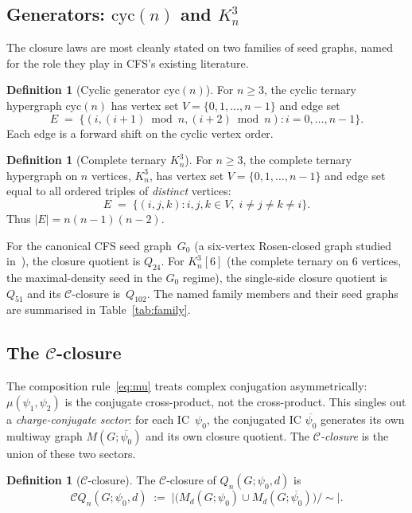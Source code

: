 \documentclass[12pt,a4paper]{article}
\theoremstyle{definition}
\newtheorem{definition}[theorem]{Definition}
\theoremstyle{remark}
\newcommand{\Kn}{K_n^3}
\newcommand{\Qn}{Q_n}
\newcommand{\Ccls}{\mathcal{C}}             %
\newcommand{\cyc}{\mathrm{cyc}}
\begin{document}
\subsection{Generators: $\cyc(n)$ and $\Kn$}
\label{sec:bg-generators}

The closure laws are most cleanly stated on two families of seed
graphs, named for the role they play in CFS's existing literature.

\begin{definition}[Cyclic generator $\cyc(n)$]\label{def:cyc}
For $n \ge 3$, the cyclic ternary hypergraph $\cyc(n)$ has vertex set
$V = \{0, 1, \dots, n{-}1\}$ and edge set
\[
E \;=\; \{(i, (i{+}1) \bmod n, (i{+}2) \bmod n) : i = 0, \dots, n{-}1\}.
\]
Each edge is a forward shift on the cyclic vertex order.
\end{definition}

\begin{definition}[Complete ternary $\Kn$]\label{def:Kn}
For $n \ge 3$, the complete ternary hypergraph on $n$ vertices, $\Kn$,
has vertex set $V = \{0, 1, \dots, n{-}1\}$ and edge set equal to all
ordered triples of \emph{distinct} vertices:
\[
E \;=\; \{(i, j, k) : i, j, k \in V, \; i \ne j \ne k \ne i\}.
\]
Thus $|E| = n(n{-}1)(n{-}2)$.
\end{definition}

For the canonical CFS seed graph~$G_0$ (a six-vertex Rosen-closed
graph studied in~\cite[\S{}Step 3]{CFS2026}), the closure quotient is
$Q_{24}$. For $\Kn[6]$ (the complete ternary on 6 vertices, the
maximal-density seed in the $G_0$ regime), the single-side closure
quotient is~$Q_{51}$ and its $\Ccls$-closure is~$Q_{102}$. The named
family members and their seed graphs are summarised in
Table~\ref{tab:family}.

\subsection{The $\Ccls$-closure}\label{sec:bg-Cclosure}

The composition rule~\eqref{eq:mu} treats complex conjugation
asymmetrically: $\mu(\psi_1, \psi_2)$ is the conjugate cross-product,
not the cross-product. This singles out a \emph{charge-conjugate
sector}: for each IC~$\psi_0$, the conjugated IC
$\overline{\psi_0}$ generates its own multiway graph
$M(G; \overline{\psi_0})$ and its own closure quotient. The
\emph{$\Ccls$-closure} is the union of these two sectors.

\begin{definition}[$\Ccls$-closure]\label{def:Cclosure}
The $\Ccls$-closure of $\Qn(G; \psi_0, d)$ is
\[
\Ccls\Qn(G; \psi_0, d) \;:=\; \big| \bigl( M_d(G; \psi_0) \cup
M_d(G; \overline{\psi_0}) \bigr) / {\sim} \big|.
\]
\end{definition}
\end{document}
